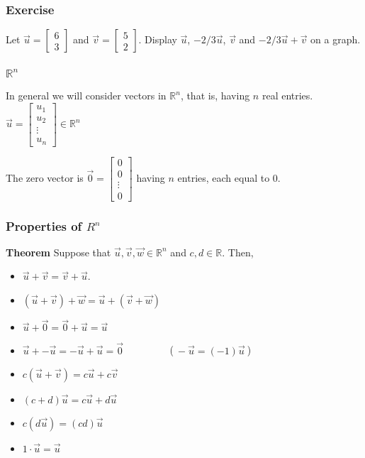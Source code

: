 \begin{frame}[fragile]\frametitle{Exercise}

     Let $\vec{u} = \left[\begin{array}{r} 6 \\3 \end{array}\right]$
    and $\vec{v} = \left[\begin{array}{r} 5 \\2 \end{array}\right]$.  Display 
    $\vec{u}$, $-2/3\vec{u}$, $\vec{v}$ and $-2/3\vec{u} + \vec{v}$
    on a graph.
  
\end{frame}

  \begin{frame}[fragile]\frametitle{ $\mathbb R^n$}
In general we will consider vectors in $\mathbb R^n$, that is, having $n$ real entries.
$
 \vec{u} = \left[\begin{array}{r} u_1 \\ u_2\\ \vdots \\ u_n \end{array}\right] \in \mathbb R^n
$

The zero vector is $\vec{0} = \left[\begin{array}{r} 0 \\ 0 \\ \vdots \\ 0 \end{array}\right]$
having $n$ entries, each equal to $0$.
\end{frame}

  \begin{frame}[fragile]\frametitle{Properties of $R^n$}
\textbf{Theorem}  Suppose that $\vec{u}, \vec{v},\vec{w}\in \mathbb R^n$ and $c,d\in \mathbb R$.  Then,
\begin{itemize}
 \item $\vec{u} + \vec{v} = \vec{v} + \vec{u}$.
 \item $(\vec{u} + \vec{v} ) + \vec{w} = 
        \vec{u} + ( \vec{v} + \vec{w})$
 \item $\vec{u} + \vec{0} = \vec{0} +\vec{u} = \vec{u}$
 \item $\vec{u} + -\vec{u} = -\vec{u}+ \vec{u} = \vec{0}$
 $\qquad \qquad$ ($\ -\vec{u} = (-1)\vec{u}\ $)
 \item $c(\vec{u} + \vec{v} ) = c\vec{u} + c\vec{v}$
 \item $(c+d)\vec{u} = c\vec{u} + d\vec{u}$
 \item $c(d\vec{u}) = (cd)\vec{u}$
 \item $1 \cdot \vec{u} =\vec{u}$
\end{itemize}


\end{frame}

